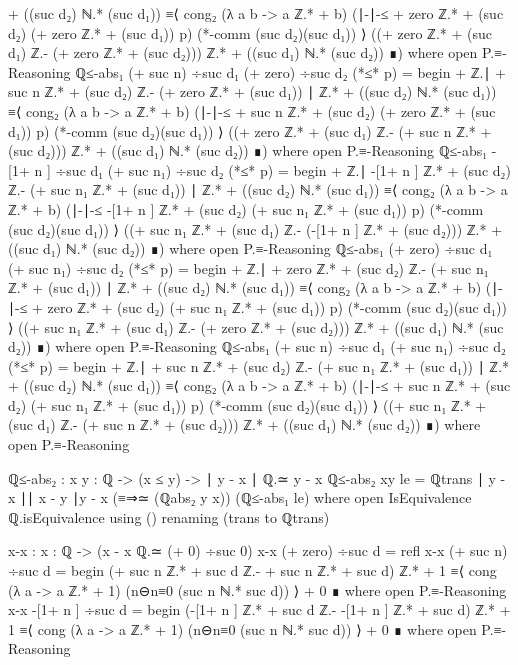 \documentclass[11pt,a4paper]{article}
\begin{document}
\begin{code}
    + ((suc d₂) ℕ.* (suc d₁)) ≡⟨ cong₂ (λ a b -> a ℤ.* + b)
    (∣-∣-≤ { + zero ℤ.* + (suc d₂)}{ (+ zero ℤ.* + (suc d₁))} p)
    (*-comm (suc d₂)(suc d₁)) ⟩
  ((+ zero ℤ.* + (suc d₁) ℤ.- (+ zero ℤ.* + (suc d₂))) ℤ.*
  + ((suc d₁) ℕ.* (suc d₂)) ∎)
     where
     open P.≡-Reasoning
ℚ≤-abs₁ {(+ suc n) ÷suc d₁} {(+ zero) ÷suc d₂} (*≤* p) = begin
    + ℤ.∣ + suc n ℤ.* + (suc d₂) ℤ.- (+ zero ℤ.* + (suc d₁)) ∣
    ℤ.* + ((suc d₂) ℕ.* (suc d₁)) ≡⟨ cong₂ (λ a b -> a ℤ.* + b)
    (∣-∣-≤ { + suc n ℤ.* + (suc d₂)}{ (+ zero ℤ.* + (suc d₁))} p)
    (*-comm (suc d₂)(suc d₁)) ⟩
  ((+ zero ℤ.* + (suc d₁) ℤ.- (+ suc n ℤ.* + (suc d₂))) ℤ.*
  + ((suc d₁) ℕ.* (suc d₂)) ∎)
     where
     open P.≡-Reasoning
ℚ≤-abs₁ { -[1+ n ] ÷suc d₁} {(+ suc n₁) ÷suc d₂} (*≤* p) = begin
    + ℤ.∣ -[1+ n ] ℤ.* + (suc d₂) ℤ.- (+ suc n₁ ℤ.* + (suc d₁)) ∣
    ℤ.* + ((suc d₂) ℕ.* (suc d₁)) ≡⟨ cong₂ (λ a b -> a ℤ.* + b)
    (∣-∣-≤ { -[1+ n ] ℤ.* + (suc d₂)}{ (+ suc n₁ ℤ.* + (suc d₁))} p)
    (*-comm (suc d₂)(suc d₁)) ⟩
  ((+ suc n₁ ℤ.* + (suc d₁) ℤ.- (-[1+ n ] ℤ.* + (suc d₂))) ℤ.*
  + ((suc d₁) ℕ.* (suc d₂)) ∎)
     where
     open P.≡-Reasoning
ℚ≤-abs₁ {(+ zero) ÷suc d₁} {(+ suc n₁) ÷suc d₂} (*≤* p) = begin
    + ℤ.∣ + zero ℤ.* + (suc d₂) ℤ.- (+ suc n₁ ℤ.* + (suc d₁)) ∣ ℤ.*
    + ((suc d₂) ℕ.* (suc d₁)) ≡⟨ cong₂ (λ a b -> a ℤ.* + b)
    (∣-∣-≤ { + zero ℤ.* + (suc d₂)}{ (+ suc n₁ ℤ.* + (suc d₁))} p)
    (*-comm (suc d₂)(suc d₁)) ⟩
  ((+ suc n₁ ℤ.* + (suc d₁) ℤ.- (+ zero ℤ.* + (suc d₂))) ℤ.*
  + ((suc d₁) ℕ.* (suc d₂)) ∎)
     where
     open P.≡-Reasoning
ℚ≤-abs₁ {(+ suc n) ÷suc d₁} {(+ suc n₁) ÷suc d₂} (*≤* p) = begin
    + ℤ.∣ + suc n ℤ.* + (suc d₂) ℤ.- (+ suc n₁ ℤ.* + (suc d₁)) ∣
    ℤ.* + ((suc d₂) ℕ.* (suc d₁)) ≡⟨ cong₂ (λ a b -> a ℤ.* + b)
    (∣-∣-≤ { + suc n ℤ.* + (suc d₂)}{ (+ suc n₁ ℤ.* + (suc d₁))} p)
    (*-comm (suc d₂)(suc d₁)) ⟩
  ((+ suc n₁ ℤ.* + (suc d₁) ℤ.- (+ suc n ℤ.* + (suc d₂))) ℤ.*
  + ((suc d₁) ℕ.* (suc d₂)) ∎)
     where
     open P.≡-Reasoning

ℚ≤-abs₂ : {x y : ℚ} -> (x ≤ y) -> ∣ y - x ∣ ℚ.≃ y - x
ℚ≤-abs₂ {x}{y} le = ℚtrans {∣ y - x ∣}{∣ x - y ∣}{y - x}
  (≡⇒≃ (ℚabs₂ y x)) (ℚ≤-abs₁ le)
  where
  open IsEquivalence ℚ.isEquivalence using ()
       renaming (trans to ℚtrans)

x-x : {x : ℚ} -> (x - x ℚ.≃ (+ 0) ÷suc 0)
x-x {(+ zero) ÷suc d} = refl
x-x {(+ suc n) ÷suc d} = begin (+ suc n ℤ.* + suc d ℤ.-
  + suc n ℤ.* + suc d) ℤ.* + 1
    ≡⟨ cong (λ a -> a ℤ.* + 1) (n⊖n≡0 (suc n ℕ.* suc d))  ⟩
    + 0 ∎
    where
      open P.≡-Reasoning
x-x { -[1+ n ] ÷suc d} = begin (-[1+ n ] ℤ.* + suc d ℤ.-
  -[1+ n ] ℤ.* + suc d) ℤ.* + 1
    ≡⟨ cong (λ a -> a ℤ.* + 1) (n⊖n≡0 (suc n ℕ.* suc d))  ⟩
    + 0 ∎
    where
    open P.≡-Reasoning


\end{code}
\end{document}
